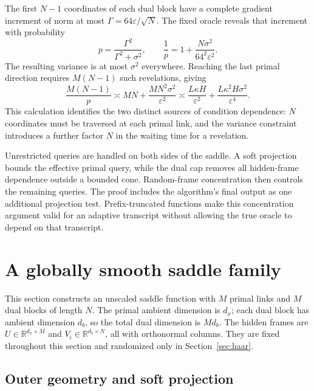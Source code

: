 \documentclass[11pt,a4paper]{article}
\newcommand{\R}{\mathbb R}
\newcommand{\eps}{\varepsilon}
\theoremstyle{definition}
\theoremstyle{remark}
\numberwithin{equation}{section}
\begin{document}
The first $N-1$ coordinates of each dual block have a complete
gradient increment of norm at most
$\Gamma=64\eps/\sqrt N$. The fixed oracle reveals that increment
with probability
\[
 p=\frac{\Gamma^2}{\Gamma^2+\sigma^2},
 \qquad
 \frac1p=1+\frac{N\sigma^2}{64^2\eps^2}.
\]
The resulting variance is at most $\sigma^2$ everywhere. Reaching the
last primal direction requires $M(N-1)$ such revelations, giving
\begin{equation}
 \frac{M(N-1)}p
 \asymp MN+\frac{MN^2\sigma^2}{\eps^2}
 \asymp\frac{L\kappa H}{\eps^2}
          +\frac{L\kappa^2H\sigma^2}{\eps^4}.
 \label{eq:rate-mechanism}
\end{equation}
This calculation identifies the two distinct sources of condition
dependence: $N$ coordinates must be traversed at each primal link,
and the variance constraint introduces a further factor $N$ in the
waiting time for a revelation.

Unrestricted queries are handled on both sides of the saddle.
A soft projection bounds the effective primal query, while the dual
cap removes all hidden-frame dependence outside a bounded cone.
Random-frame concentration then controls the remaining queries.
The proof includes the algorithm's final output as one additional
projection test. Prefix-truncated functions make this concentration
argument valid for an adaptive transcript without allowing the true
oracle to depend on that transcript.

\section{A globally smooth saddle family}
\label{sec:construction}

This section constructs an unscaled saddle function with $M$ primal
links and $M$ dual blocks of length $N$. The primal ambient dimension
is $d_x$; each dual block has ambient dimension $d_b$, so the total
dual dimension is $Md_b$. The hidden frames are
$U\in\R^{d_x\times M}$ and
$V_i\in\R^{d_b\times N}$, all with orthonormal columns.
They are fixed throughout this section and randomized only in
Section~\ref{sec:haar}.

\subsection{Outer geometry and soft projection}
\label{sec:outer}
\end{document}
